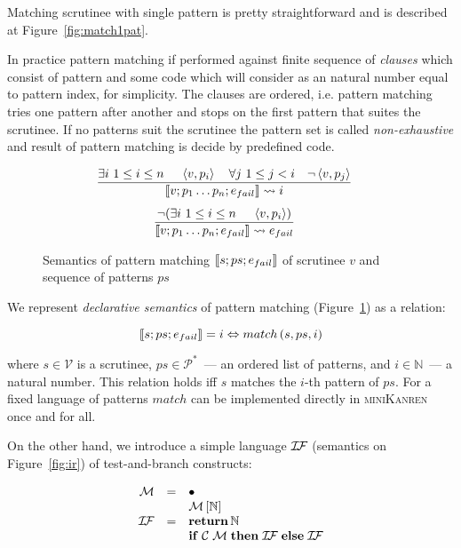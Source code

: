 Matching scrutinee with single pattern is pretty straightforward and is described at Figure~\ref{fig:match1pat}.

In practice pattern matching if performed against finite sequence of \emph{clauses} which consist of pattern and some code which will consider as an natural number equal to pattern index, for simplicity. The clauses are ordered, i.e. pattern matching tries one pattern after another and stops on the first pattern that suites the scrutinee. If no patterns suit the scrutinee the pattern set is called \emph{non-exhaustive} and result of pattern matching is decide by predefined code.   

\begin{figure}
   \[
   \begin{array}{cr}
     \dfrac{\exists i\ 1\le i\le n\ \quad \left<{v, p_i}\right>\quad \forall j\ 1\le j < i \quad \neg \left<{v,p_j}\right>}{\llbracket{v; p_1\dots p_n; e_{fail}}\rrbracket \leadsto i} & 
       \\[5mm]
     \dfrac{\neg (\exists i\ 1\le i\le n\ \quad \left<{v, p_i}\right>)}{\llbracket{v; p_1\dots p_n; e_{fail}}\rrbracket \leadsto e_{fail}} & 
   \end{array}
   \]
   \caption{Semantics of pattern matching $\llbracket{s; ps; e_{fail}}\rrbracket$ of scrutinee $v$ and sequence of patterns $ps$}
  \label{fig:match}
\end{figure}
 

We represent \emph{declarative semantics} of pattern matching (Figure~\ref{fig:match}) as a relation:
 
 \[
  \llbracket{s; ps; e_{fail}}\rrbracket = i \Leftrightarrow   match\, (s, ps, i)
 \]
 
 where $s\in\mathcal{V}$ is a scrutinee, $ps\in\mathcal{P}^*$~--- an ordered list of patterns, and $i\in\mathbb{N}$~--- a natural number.
 This relation holds iff $s$ matches the $i$-th pattern of $ps$. For a fixed language of patterns $match$ can be implemented directly
 in \textsc{miniKanren} once and for all.
 
 On the other hand, we introduce a simple language $\mathcal{I\!F}$ (semantics on Figure~\ref{fig:ir}) of test-and-branch constructs:
 
 \[
 \begin{array}{rcl}
   \mathcal M & = & \bullet \\
              &   & \mathcal M\,[\mathbb{N}] \\
   \mathcal{I\!F} & = & \mathbf{return}\,\mathbb{N} \\
              &   & \mathbf{if}\;\mathcal{C}\;\mathcal{M}\;\mathbf{then}\;\mathcal{I\!F}\;\mathbf{else}\;\mathcal{I\!F}
 \end{array}
 \]
 
